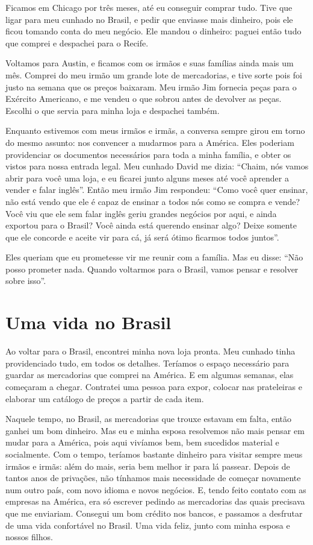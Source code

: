 Ficamos em Chicago por três meses, até eu conseguir comprar tudo. Tive que
ligar para meu cunhado no Brasil, e pedir que enviasse mais dinheiro, pois ele ficou tomando conta do meu negócio. Ele mandou o dinheiro: 
paguei então tudo que comprei e despachei para o Recife.

Voltamos para Austin, e ficamos com os irmãos e suas famílias ainda mais
um mês. Comprei do meu irmão um grande lote de mercadorias, e tive
sorte pois foi justo na semana que os preços baixaram. Meu irmão Jim
fornecia peças para o Exército Americano, e me vendeu o que sobrou
antes de devolver as peças. Escolhi o que servia para minha loja e
despachei também.

Enquanto estivemos com meus irmãos e irmãs, a conversa sempre
girou em torno do mesmo assunto: nos convencer a mudarmos para a
América. Eles poderiam providenciar os documentos necessários para toda a 
minha família, e obter os vistos para nossa entrada legal. Meu cunhado
David me dizia: ``Chaim, nós vamos abrir para você uma loja, e eu ficarei
junto alguns meses até você aprender a vender e falar inglês''. Então
meu irmão Jim respondeu: ``Como você quer ensinar, não está vendo que
ele é capaz de ensinar a todos nós como se compra e vende? Você viu que
ele sem falar inglês geriu grandes negócios por aqui, e ainda
exportou para o Brasil? Você ainda está querendo ensinar algo?
Deixe somente que ele concorde e aceite vir para cá, já será ótimo
ficarmos todos juntos''.

Eles queriam que eu prometesse vir me reunir
com a família. Mas eu disse: ``Não posso prometer nada. Quando 
voltarmos para o Brasil, vamos pensar e resolver sobre isso''.

\chapter{Uma vida no Brasil}

Ao voltar para o Brasil, encontrei minha nova loja pronta. Meu
cunhado tinha providenciado tudo, em todos os detalhes. Teríamos
o espaço necessário para guardar as mercadorias que comprei na América. 
E em algumas semanas, elas começaram a chegar. Contratei
uma pessoa para expor, colocar nas
prateleiras e elaborar um catálogo de preços a partir de cada item.

Naquele tempo, no Brasil, as mercadorias que trouxe estavam em falta, 
então ganhei um bom dinheiro. Mas eu e minha
esposa resolvemos não mais pensar em mudar para a América, pois 
aqui vivíamos bem, bem sucedidos material e socialmente. Com o tempo, 
teríamos bastante dinheiro para visitar sempre meus irmãos e irmãs: além do mais, 
seria bem melhor ir para lá passear. Depois de tantos anos de privações, não
tínhamos mais necessidade de começar novamente num outro país, com 
novo idioma e novos negócios. E, tendo feito contato com as empresas na América, 
era só escrever pedindo as mercadorias das quais precisava que me
enviariam. Consegui um bom crédito nos bancos, e passamos a desfrutar de
uma vida confortável no Brasil. Uma vida feliz, junto com minha
esposa e nossos filhos.

